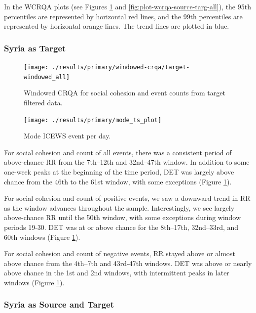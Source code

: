 \documentclass[english,man]{apa6}
\begin{document}
In the WCRQA plots (see Figures \ref{fig:plot-wcrqa-targ-all} and
\ref{fig:plot-wcrqa-source-targ-all}), the 95th percentiles are represented by
horizontal red lines, and the 99th percentiles are represented by horizontal
orange lines. The trend lines are plotted in blue.

\hypertarget{syria-as-target-1}{%
\subsubsection{Syria as Target}\label{syria-as-target-1}}

\begin{figure}
\texttt{[image: ./results/primary/windowed-crqa/target-windowed\_all]} \caption{Windowed CRQA for social cohesion and event counts from target filtered data.}\label{fig:plot-wcrqa-targ-all}
\end{figure}

\begin{figure}
\texttt{[image: ./results/primary/mode\_ts\_plot]} \caption{Mode ICEWS event per day.}\label{fig:plot-mode-event}
\end{figure}

For social cohesion and count of all events, there was a consistent period of
above-chance RR from the 7th--12th and 32nd--47th window. In addition to some
one-week peaks at the beginning of the time period, DET was largely above chance
from the 46th to the 61st window, with some exceptions (Figure
\ref{fig:plot-wcrqa-targ-all}).

For social cohesion and count of positive events, we saw a downward trend in RR
as the window advances throughout the sample. Interestingly, we see largely
above-chance RR until the 50th window, with some exceptions during window
periods 19-30. DET was at or above chance for the 8th--17th, 32nd--33rd, and
60th windows (Figure \ref{fig:plot-wcrqa-targ-all}).

For social cohesion and count of negative events, RR stayed above or almost
above chance from the 4th--7th and 43rd-47th windows. DET was above or nearly
above chance in the 1st and 2nd windows, with intermittent peaks in later
windows (Figure \ref{fig:plot-wcrqa-targ-all}).

\hypertarget{syria-as-source-and-target-1}{%
\subsubsection{Syria as Source and Target}\label{syria-as-source-and-target-1}}
\end{document}
